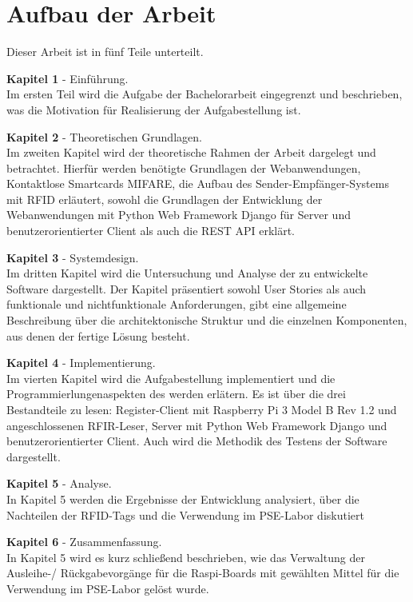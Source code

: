 \section{Aufbau der Arbeit}
\label{sec:intro:themengebiet}
Dieser Arbeit ist in fünf Teile unterteilt. 

\textbf{Kapitel 1} - Einführung.\\
Im ersten Teil wird die Aufgabe der Bachelorarbeit eingegrenzt und beschrieben, was die Motivation für Realisierung der Aufgabestellung ist. 

\textbf{Kapitel 2} - Theoretischen Grundlagen.\\ 
Im zweiten Kapitel wird der theoretische Rahmen der Arbeit dargelegt und betrachtet. Hierfür
werden benötigte Grundlagen der Webanwendungen, Kontaktlose Smartcards MIFARE, die Aufbau des Sender-Empfänger-Systems mit RFID erläutert, sowohl die Grundlagen der Entwicklung der Webanwendungen mit Python Web Framework Django für Server und benutzerorientierter Client als auch die REST API erklärt.

\textbf{Kapitel 3} - Systemdesign.\\
Im dritten Kapitel wird die Untersuchung und Analyse der zu entwickelte Software dargestellt. Der Kapitel präsentiert sowohl User Stories als auch funktionale und nichtfunktionale Anforderungen, gibt eine allgemeine Beschreibung über die architektonische Struktur und die einzelnen Komponenten, aus denen der fertige Lösung besteht.

\textbf{Kapitel 4} - Implementierung.\\
Im vierten Kapitel wird die Aufgabestellung implementiert und die Programmierlungenaspekten des werden erlätern. Es ist über die drei Bestandteile zu lesen: Register-Client mit Raspberry Pi 3 Model B Rev 1.2 und angeschlossenen RFIR-Leser, Server mit Python Web Framework Django und benutzerorientierter Client. Auch wird die Methodik des Testens der Software dargestellt.

\textbf{Kapitel 5} - Analyse.\\
In Kapitel 5 werden die Ergebnisse der Entwicklung analysiert, über die Nachteilen der RFID-Tags und die Verwendung im PSE-Labor diskutiert 

\textbf{Kapitel 6} - Zusammenfassung.\\
In Kapitel 5 wird es kurz schließend beschrieben, wie das Verwaltung der Ausleihe-/ Rückgabevorgänge für die Raspi-Boards mit gewählten Mittel für die Verwendung im PSE-Labor gelöst wurde. 

